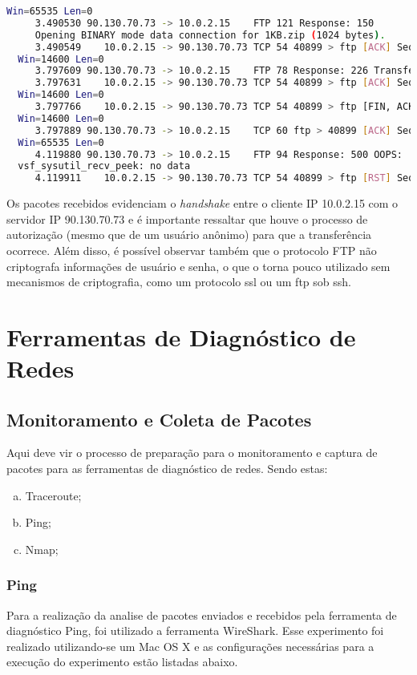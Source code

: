 \documentclass[a4paper]{report} %
\begin{document}
\begin{lstlisting}[language=bash]
  Win=65535 Len=0
     3.490530 90.130.70.73 -> 10.0.2.15    FTP 121 Response: 150
     Opening BINARY mode data connection for 1KB.zip (1024 bytes).
     3.490549    10.0.2.15 -> 90.130.70.73 TCP 54 40899 > ftp [ACK] Seq=83 Ack=264
  Win=14600 Len=0
     3.797609 90.130.70.73 -> 10.0.2.15    FTP 78 Response: 226 Transfer complete.
     3.797631    10.0.2.15 -> 90.130.70.73 TCP 54 40899 > ftp [ACK] Seq=83 Ack=288
  Win=14600 Len=0
     3.797766    10.0.2.15 -> 90.130.70.73 TCP 54 40899 > ftp [FIN, ACK] Seq=83 Ack=288
  Win=14600 Len=0
     3.797889 90.130.70.73 -> 10.0.2.15    TCP 60 ftp > 40899 [ACK] Seq=288 Ack=84
  Win=65535 Len=0
     4.119880 90.130.70.73 -> 10.0.2.15    FTP 94 Response: 500 OOPS:
  vsf_sysutil_recv_peek: no data
     4.119911    10.0.2.15 -> 90.130.70.73 TCP 54 40899 > ftp [RST] Seq=84 Win=0 Len=0

\end{lstlisting}

	Os pacotes recebidos evidenciam o \textit{handshake} entre o cliente IP 10.0.2.15 com o servidor IP 90.130.70.73 e é importante ressaltar que houve o processo de autorização (mesmo que de um usuário anônimo) para que a transferência ocorrece. Além disso, é possível observar também que o protocolo FTP não criptografa informações de usuário e senha, o que o torna pouco utilizado sem mecanismos de criptografia, como um protocolo ssl ou um ftp sob ssh.

\chapter{Ferramentas de Diagnóstico de Redes}
\label{chap_segundo}

\section{Monitoramento e Coleta de Pacotes}
\label{sec_segundo_monitoramento}

Aqui deve vir o processo de preparação para o monitoramento e captura de pacotes para as ferramentas de
diagnóstico de redes. Sendo estas:
\begin{enumerate}[a)]
 \item Traceroute;
 \item Ping;
 \item Nmap;
\end{enumerate}

\subsection{Ping}
Para a realização da analise de pacotes enviados e recebidos pela ferramenta de diagnóstico Ping, foi utilizado a ferramenta WireShark. Esse experimento foi realizado utilizando-se um Mac OS X e as configurações necessárias para a execução do experimento estão listadas abaixo.
\end{document}
